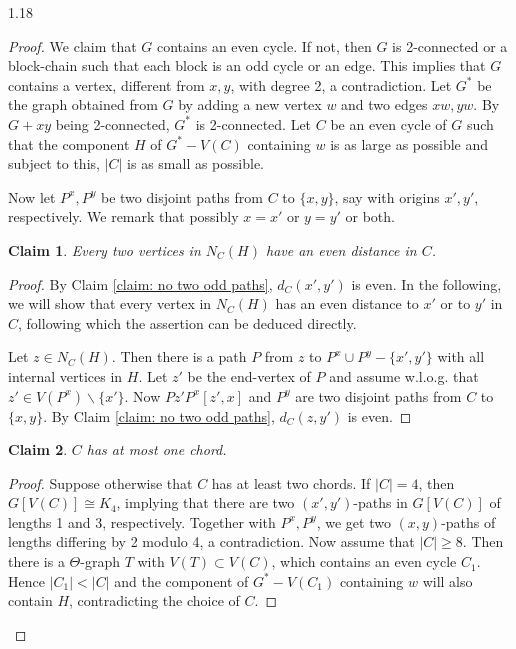 \documentclass[10pt]{article}
\newtheorem{claim}{Claim}
\begin{document}
\begin{spacing}{1.18}
\begin{proof}
We claim that $G$ contains an even cycle. If not, then $G$ is 2-connected or a block-chain such that each block is an odd cycle or an edge. This implies that $G$ contains a vertex, different from $x,y$, with degree 2, a contradiction. Let $G^*$ be the graph obtained from $G$ by adding a new vertex $w$ and two edges $xw,yw$. By $G+xy$ being 2-connected, $G^*$ is 2-connected. Let $C$ be an even cycle of $G$ such that the component $H$ of $G^*-V(C)$ containing $w$ is as large as possible and subject to this, $|C|$ is as small as possible.

Now let $P^x, P^y$ be two disjoint paths from $C$ to $\{x,y\}$, say with origins $x',y'$, respectively. We remark that possibly $x=x'$ or $y=y'$ or both.

\begin{claim}\label{claim: evendistance}
    Every two vertices in $N_C(H)$ have an even distance in $C$.
\end{claim}

\begin{proof}
    By Claim \ref{claim: no two odd paths}, $d_C(x',y')$ is even. In the following, we will show that every vertex in $N_C(H)$ has an even distance to $x'$ or to $y'$ in $C$, following which the assertion can be deduced directly.

    Let $z\in N_C(H)$. Then there is a path $P$ from $z$ to $P^x\cup P^y-\{x',y'\}$ with all internal vertices in $H$. Let $z'$ be the end-vertex of $P$ and assume w.l.o.g. that $z'\in V(P^x)\backslash\{x'\}$. Now $Pz'P^x[z',x]$ and $P^y$ are two disjoint paths from $C$ to $\{x,y\}$. By Claim \ref{claim: no two odd paths}, $d_C(z,y')$ is even.
\end{proof}

\begin{claim}\label{claim: mostonechord}
    $C$ has at most one chord.
\end{claim}

\begin{proof}
    Suppose otherwise that $C$ has at least two chords. If $|C|=4$, then $G[V(C)]\cong K_4$, implying that there are two $(x',y')$-paths in $G[V(C)]$ of lengths 1 and 3, respectively. Together with $P^x,P^y$, we get two $(x,y)$-paths of lengths differing by 2 modulo 4, a contradiction. Now assume that $|C|\geqslant 8$. Then there is a $\varTheta$-graph $T$ with $V(T)\subset V(C)$, which contains an even cycle $C_1$. Hence $|C_1|<|C|$ and the component of $G^*-V(C_1)$ containing $w$ will also contain $H$, contradicting the choice of $C$. 
\end{proof}


\end{proof}
\end{spacing}
\end{document}
